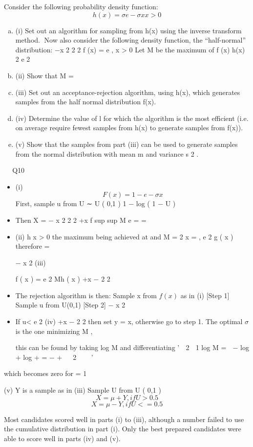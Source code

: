 \documentclass[a4paper,12pt]{article}
\begin{document}
Consider the following probability density function:
\[h(x) = \sigma e −\sigma x x > 0\]
\begin{enumerate}[(a)]
\item (i)
Set out an algorithm for sampling from h(x) using the inverse transform
method.
Now also consider the following density function, the “half-normal” distribution:
−x 2
2 2 
f (x) =
e
, x > 0
\sigma \pi 
Let M be the maximum of
f (x)
h(x)
2
 
e 2
\item (ii) Show that M =
\item (iii) Set out an acceptance-rejection algorithm, using h(x), which generates samples
from the half normal distribution f(x).
\item (iv) Determine the value of l for which the algorithm is the most efficient (i.e. on
average require fewest samples from h(x) to generate samples from f(x)).
\item (v) Show that the samples from part (iii) can be used to generate samples from the
normal distribution with mean m and variance s 2 .
\end{enumerate}

\sigma\sigma \pi 

\newpage 
Q10
\begin{itemize}
\item (i)
\[F ( x ) = 1 − e −\sigma x \]
First, sample u from U ∼ U ( 0,1 ) 
1
− log ( 1 − U )
\item Then X =
\sigma 
− x 2
2 2  +\sigma x
f
sup
sup
M
e
=
=
\item (ii)
h x > 0 \sigma\sigma \pi 
the maximum being achieved at
and M =
2
\sigma\sigma \pi 
x = \sigma ,
 
e 2
g ( x )
therefore =


− x 2
(iii)

f ( x )
= e 2 \sigma
Mh ( x )
+\sigma x −
2
 
2

\item The rejection algorithm is then:
Sample x from $f ( x )$ as in (i) [Step 1] 
Sample u from U(0,1) [Step 2] 
− x 2

\item If u< e 2 \sigma
(iv)
+\sigma x −
2
 
2
then set y = x, otherwise go to step 1.
The optimal $\sigma$ is the one minimizing M ,


this can be found by taking log M and differentiating
'

2   
1
log M =  − log \sigma + log
+
= − + \sigma{}


2  
\sigma
\sigma \pi 

'
\end{itemize}
which becomes zero for \sigma =
1
\sigma

(v)
Y is a sample as in (iii)
Sample U from U ( 0,1 ) 
\[X = \mu + Y , if U > 0.5 \]
\[X = \mu − Y , if U <= 0.5\]


Most candidates scored well in parts (i) to (iii), although a number
failed to use the cumulative distribution in part (i).
Only the best prepared candidates were able to score well in parts (iv)
and (v).
\end{document}
